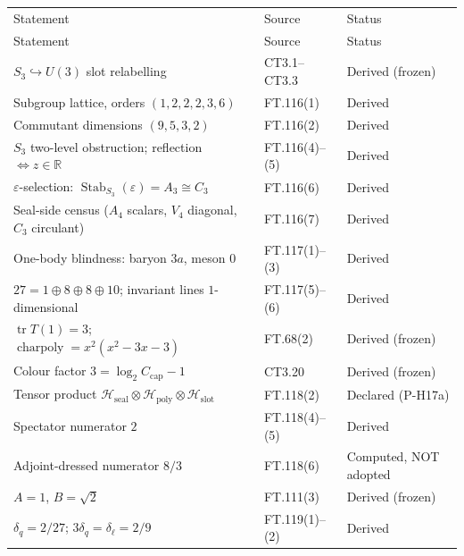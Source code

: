 \documentclass[11pt,openany]{report}
\theoremstyle{canonplain}
\theoremstyle{canondef}
\begin{document}
{\small\setlength{\tabcolsep}{4pt}
\begin{longtable}{>{\raggedright\arraybackslash}p{}|>{\raggedright\arraybackslash}p{}|>{\raggedright\arraybackslash}p{}}
\toprule
Statement & Source & Status \\
\addlinespace[2pt]
\midrule
\endfirsthead
\toprule
Statement & Source & Status \\
\addlinespace[2pt]
\midrule
\endhead
\bottomrule
\endlastfoot
$S_3\hookrightarrow U(3)$ slot relabelling & CT3.1–CT3.3 & Derived (frozen) \\
Subgroup lattice, orders $(1,\allowbreak 2,\allowbreak 2,\allowbreak 2,\allowbreak 3,\allowbreak 6)$ & FT.116(1) & Derived \\
Commutant dimensions $(9,\allowbreak 5,\allowbreak 3,\allowbreak 2)$ & FT.116(2) & Derived \\
$S_3$ two-level obstruction; reflection $\iff\allowbreak  z\in\allowbreak \mathbb R$ & FT.116(4)–(5) & Derived \\
$\varepsilon$-selection: $\operatorname{Stab}_{S_3}(\varepsilon)=\allowbreak A_3\cong C_3$ & FT.116(6) & Derived \\
Seal-side census ($A_4$ scalars, $V_4$ diagonal, $C_3$ circulant) & FT.116(7) & Derived \\
One-body blindness: baryon $3a$, meson $0$ & FT.117(1)–(3) & Derived \\
$27=\allowbreak 1\oplus8\oplus8\oplus10$; invariant lines $1$-dimensional & FT.117(5)–(6) & Derived \\
$\operatorname{tr}T(1)=\allowbreak 3$; $\operatorname{charpoly}=\allowbreak x^2(x^2-3x-3)$ & FT.68(2) & Derived (frozen) \\
Colour factor $3=\allowbreak \log_2C_{\mathrm{cap}}-1$ & CT3.20 & Derived (frozen) \\
Tensor product $\mathcal H_{\mathrm{seal}}\otimes\mathcal H_{\mathrm{poly}}\otimes\mathcal H_{\mathrm{slot}}$ & FT.118(2) & Declared (P-H17a) \\
Spectator numerator $2$ & FT.118(4)–(5) & Derived \\
Adjoint-dressed numerator $8/3$ & FT.118(6) & Computed, NOT adopted \\
$A=\allowbreak 1$, $B=\allowbreak \sqrt2$ & FT.111(3) & Derived (frozen) \\
$\delta_q=\allowbreak 2/27$; $3\delta_q=\allowbreak \delta_\ell=\allowbreak 2/9$ & FT.119(1)–(2) & Derived \\

\end{longtable}}
\end{document}
